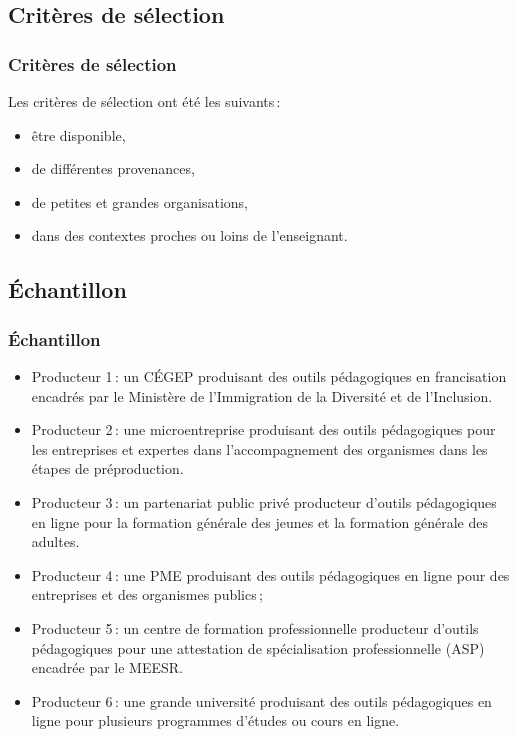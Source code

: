				\subsection{Critères de sélection} 
					\begin{frame}[allowframebreaks]
						\frametitle{Critères de sélection}
                        			Les critères de sélection ont été les suivants\,:
                        			\begin{itemize} 
                       				\item être disponible,
							\item de différentes provenances, 
							\item de petites et grandes organisations, 
							\item dans des contextes proches ou loins de l'enseignant.
                       		 \end{itemize}
                       		 \end{frame}
                       		 \subsection{Échantillon} 
					\begin{frame}[allowframebreaks]
						\frametitle{Échantillon}
                        
                        			\begin{itemize} 
                       				\item Producteur 1\,: un CÉGEP produisant des outils pédagogiques en francisation encadrés par le Ministère de l’Immigration de la Diversité et de l'Inclusion.
                       				\item Producteur 2\,: une microentreprise produisant des outils pédagogiques pour les entreprises et expertes dans l’accompagnement des organismes dans les étapes de préproduction.
							\item Producteur 3\,: un partenariat public privé producteur d’outils pédagogiques en ligne pour la formation générale des jeunes et la formation générale des adultes.
							\item Producteur 4\,: une PME produisant des outils pédagogiques en ligne pour des entreprises et des organismes publics\,;
							\item Producteur 5\,: un centre de formation professionnelle producteur d’outils pédagogiques pour une attestation de spécialisation professionnelle (ASP) encadrée par le MEESR.
							\item Producteur 6\,: une grande université produisant des outils pédagogiques en ligne pour plusieurs programmes d’études ou cours en ligne.

                       		 \end{itemize}
                       		           
                \end{frame}
                       		 
